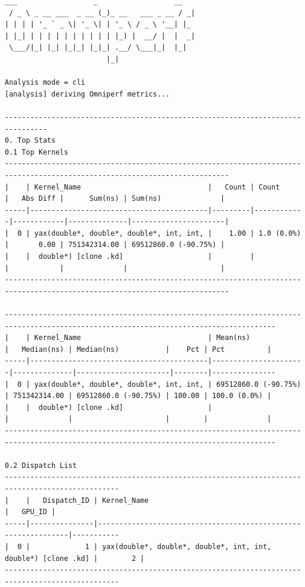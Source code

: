 \documentclass[
]{article}
\begin{document}
\begin{Verbatim}[fontsize=\tiny] 
  ___                  _                  __
 / _ \ _ __ ___  _ __ (_)_ __   ___ _ __ / _|
| | | | '_ ` _ \| '_ \| | '_ \ / _ \ '__| |_
| |_| | | | | | | | | | | |_) |  __/ |  |  _|
 \___/|_| |_| |_|_| |_|_| .__/ \___|_|  |_|
                        |_|

Analysis mode = cli
[analysis] deriving Omniperf metrics...

--------------------------------------------------------------------------------
0. Top Stats
0.1 Top Kernels
---------------------------------------------------------------------------------------------------------------------------
|    | Kernel_Name                              |   Count | Count      |   Abs Diff |      Sum(ns) | Sum(ns)              |
-----|------------------------------------------|---------|------------|------------|--------------|----------------------|
|  0 | yax(double*, double*, double*, int, int, |    1.00 | 1.0 (0.0%) |       0.00 | 751342314.00 | 69512860.0 (-90.75%) |
|    |  double*) [clone .kd]                    |         |            |            |              |                      |
---------------------------------------------------------------------------------------------------------------------------

--------------------------------------------------------------------------------------------------------------------------------------
|    | Kernel_Name                              | Mean(ns)             |   Median(ns) | Median(ns)           |    Pct | Pct          |
-----|------------------------------------------|----------------------|--------------|----------------------|--------|---------------
|  0 | yax(double*, double*, double*, int, int, | 69512860.0 (-90.75%) | 751342314.00 | 69512860.0 (-90.75%) | 100.00 | 100.0 (0.0%) |
|    |  double*) [clone .kd]                    |                      |              |                      |        |              |
--------------------------------------------------------------------------------------------------------------------------------------

0.2 Dispatch List
-------------------------------------------------------------------------------------------------
|    |   Dispatch_ID | Kernel_Name                                                   |   GPU_ID |
-----|---------------|---------------------------------------------------------------|-----------
|  0 |             1 | yax(double*, double*, double*, int, int, double*) [clone .kd] |        2 |
-------------------------------------------------------------------------------------------------



\end{Verbatim}
\end{document}
